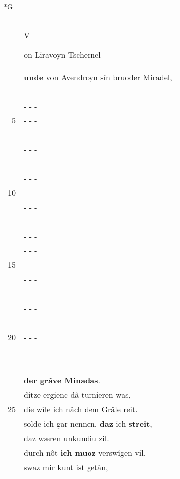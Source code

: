 \documentclass[8pt,a4paper,notitlepage]{article}
\begin{document}
\begin{table}[ht]
\begin{minipage}[t]{0.5\linewidth}
\small
\begin{center}*G
\end{center}
\begin{tabular}{rl}
 & \begin{Large}V\end{Large}on Liravoyn Tschernel\\ 
 & \textbf{unde} von Avendroyn sîn bruoder Miradel,\\ 
 & \multicolumn{1}{l}{ - - - }\\ 
 & \multicolumn{1}{l}{ - - - }\\ 
5 & \multicolumn{1}{l}{ - - - }\\ 
 & \multicolumn{1}{l}{ - - - }\\ 
 & \multicolumn{1}{l}{ - - - }\\ 
 & \multicolumn{1}{l}{ - - - }\\ 
 & \multicolumn{1}{l}{ - - - }\\ 
10 & \multicolumn{1}{l}{ - - - }\\ 
 & \multicolumn{1}{l}{ - - - }\\ 
 & \multicolumn{1}{l}{ - - - }\\ 
 & \multicolumn{1}{l}{ - - - }\\ 
 & \multicolumn{1}{l}{ - - - }\\ 
15 & \multicolumn{1}{l}{ - - - }\\ 
 & \multicolumn{1}{l}{ - - - }\\ 
 & \multicolumn{1}{l}{ - - - }\\ 
 & \multicolumn{1}{l}{ - - - }\\ 
 & \multicolumn{1}{l}{ - - - }\\ 
20 & \multicolumn{1}{l}{ - - - }\\ 
 & \multicolumn{1}{l}{ - - - }\\ 
 & \multicolumn{1}{l}{ - - - }\\ 
 & \textbf{der grâve Minadas}.\\ 
 & ditze ergienc dâ turnieren was,\\ 
25 & die wîle ich nâch dem Grâle reit.\\ 
 & solde ich gar nennen, \textbf{daz} ich \textbf{streit},\\ 
 & daz wæren unkundiu zil.\\ 
 & durch nôt \textbf{ich muoz} verswîgen vil.\\ 
 & swaz mir kunt ist getân,\\ 

\end{tabular}
\end{minipage}
\end{table}
\end{document}
